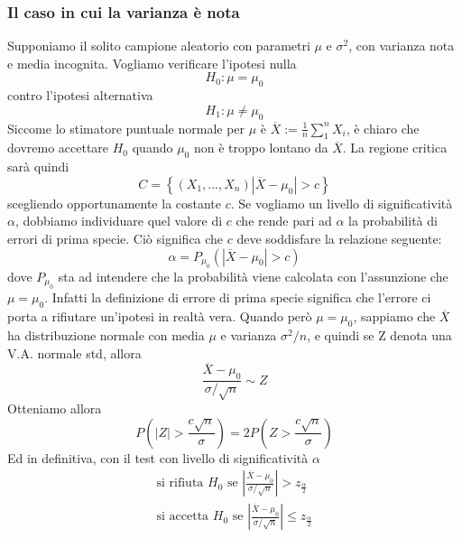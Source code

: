 \documentclass[11pt]{article}
\begin{document}
\subsubsection{Il caso in cui la varianza è nota}
Supponiamo il solito campione aleatorio con parametri $\mu$ e $\sigma^2$, con varianza nota e media incognita. Vogliamo verificare l'ipotesi nulla
\begin{displaymath}
    H_0:\mu = \mu_0
\end{displaymath}
contro l'ipotesi alternativa
\begin{displaymath}
    H_1:\mu \neq \mu_0
\end{displaymath}
Siccome lo stimatore puntuale normale per $\mu$ è $\overline{X}:=\frac{1}{n}\sum_1^n X_i$, è chiaro che dovremo accettare $H_0$ quando $\mu_0$ non è troppo lontano da $\overline{X}$. La regione critica sarà quindi
\begin{displaymath}
    C=\left\{(X_1,...,X_n) |\overline{X}-\mu_0|>c \right\}
\end{displaymath}
scegliendo opportunamente la costante $c$. Se vogliamo un livello di significatività $\alpha$, dobbiamo individuare quel valore di $c$ che rende pari ad $\alpha$ la probabilità di errori di prima specie. Ciò significa che $c$ deve soddisfare la relazione seguente:
\begin{displaymath}
    \alpha=P_{\mu_0}(|\overline{X}-\mu_0|>c)
\end{displaymath}
dove $P_{\mu_0}$ sta ad intendere che la probabilità viene calcolata con l'assunzione che $\mu=\mu_0$. Infatti la definizione di errore di prima specie significa che l'errore ci porta a rifiutare un'ipotesi in realtà vera. Quando però $\mu=\mu_0$, sappiamo che $\overline{X}$ ha distribuzione normale con media $\mu$ e varianza $\sigma^2/n$, e quindi se Z denota una V.A. normale std, allora
\begin{displaymath}
    \frac{\overline{X}-\mu_0}{\sigma/\sqrt{n}}\sim Z
\end{displaymath}
Otteniamo allora 
\begin{displaymath}
    P\left(|Z|>\frac{c\sqrt{n}}{\sigma} \right) = 2P\left(Z>\frac{c\sqrt{n}}{\sigma} \right) 
\end{displaymath}
Ed in definitiva, con il test con livello di significatività $\alpha$
\begin{gather*}
    \mbox{si rifiuta }H_0\mbox{ se }\left|\frac{\overline{X}-\mu_0}{\sigma/\sqrt{n}}   \right| > z_{\frac{\alpha}{2}}\\ 
    \mbox{si accetta }H_0\mbox{ se }\left|\frac{\overline{X}-\mu_0}{\sigma/\sqrt{n}}   \right| \le z_{\frac{\alpha}{2}} 
\end{gather*}
\end{document}
